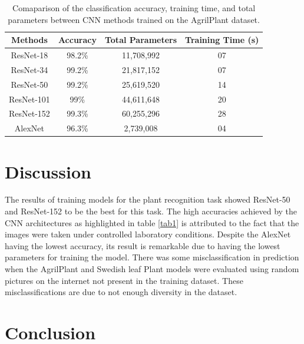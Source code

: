 \documentclass[conference]{IEEEtran}
\begin{document}
\begin{table}[htbp]
\caption{Comaparison of the classification accuracy, training time, and total parameters between CNN methods trained on the AgrilPlant dataset.}
\begin{center}
\begin{tabular}{c|c|c|c}

\textbf{Methods} & \textbf{Accuracy}& \textbf{Total Parameters}& \textbf{Training Time (s)} \\
\hline
ResNet-18 & 98.2\%& 11,708,992 & 07 \\
\hline
ResNet-34 & 99.2\%& 21,817,152 & 07 \\
\hline
ResNet-50 & 99.2\%& 25,619,520 & 14 \\
\hline
ResNet-101 & 99\%& 44,611,648 & 20 \\
\hline
ResNet-152 & 99.3\%& 60,255,296 & 28 \\
\hline
AlexNet & 96.3\%& 2,739,008 & 04 \\

\end{tabular}
\label{table:agril}
\end{center}
\end{table}
\section{Discussion}

The results of training models for the plant recognition task showed ResNet-50 and ResNet-152 to be the best for this task. The high accuracies achieved by the CNN architectures as highlighted in table \ref{tab1} is attributed to the fact that the images were taken under controlled laboratory conditions. Despite the AlexNet having the lowest accuracy, its result is remarkable due to having the lowest parameters for training the model. There was some misclassification in prediction when the AgrilPlant and Swedish leaf Plant models were evaluated using random pictures on the internet not present in the training dataset. These misclassifications are due to not enough diversity in the dataset. 
\section{Conclusion}







\vspace{12pt}
\end{document}
